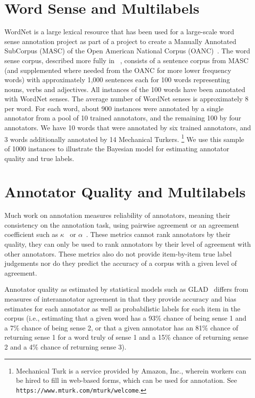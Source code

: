 \documentclass[11pt]{article}
\begin{document}
\section{Word Sense and Multilabels} %

WordNet is a large lexical resource that has been used for a
large-scale word sense annotation project as part of a project to
create a Manually Annotated SubCorpus (MASC) of the Open American
National Corpus (OANC)~\cite{ideEtAl10}. The word sense corpus,
described more fully in ~\cite{passonneauEtAl12}, consists of a
sentence corpus from MASC (and supplemented where needed from the OANC
for more lower frequency words) with approximately 1,000 sentences
each for 100 words representing nouns, verbs and adjectives. All
instances of the 100 words have been annotated with WordNet senses.
The average number of WordNet senses is approximately 8 per word. For
each word, about 900 instances were annotated by a single annotator
from a pool of 10 trained annotators, and the remaining 100 by four
annotators. We have 10 words that were annotated by six trained
annotators, and 3 words additionally annotated by 14 Mechanical
Turkers.%
%
\footnote{Mechanical Turk is a service provided by Amazon, Inc.,
wherein workers can be hired to fill in web-based forms, which can
be used for annotation.  See {\tt https://www.mturk.com/mturk/welcome}.}
%
We use this sample of 1000 instances to illustrate the
Bayesian model for estimating annotator quality and true labels.

\section{Annotator Quality and Multilabels} %

Much work on annotation measures reliability of annotators, meaning
their consistency on the annotation task, using pairwise agreement or
an agreement coefficient such as $\kappa$~\cite{cohen60} or
$\alpha$~\cite{krippendorff80}. These metrics cannot rank annotators
by their quality, they can only be used to rank annotators by their
level of agreement with other annotators.  These metrics also do
not provide item-by-item true label judgements nor do they predict
the accuracy of a corpus with a given level of agreement.

Annotator quality as estimated by statistical models such as
GLAD~\cite{dawidSkene79,whitehillEtAl-2009} differs from measures of
interannotator agreement in that they provide accuracy and bias
estimates for each annotator as well as probabilistic labels for each
item in the corpus (i.e., estimating that a given word has a 93\%
chance of being sense 1 and a 7\% chance of being sense 2, or that a
given annotator has an 81\% chance of returning sense 1 for a word
truly of sense 1 and a 15\% chance of returning sense 2 and a 4\%
chance of returning sense 3).
\end{document}
